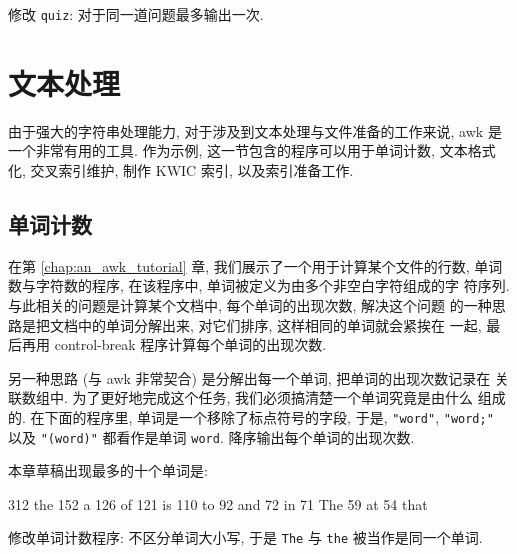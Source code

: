 \begin{exercise}
    \label{exer:quiz}
    修改 \texttt{quiz}: 对于同一道问题最多输出一次.
\end{exercise}

\section{文本处理}
\label{sec:text_processing}

由于强大的字符串处理能力, 对于涉及到文本处理与文件准备的工作来说, awk 是
一个非常有用的工具. 作为示例, 这一节包含的程序可以用于单词计数, 文本格式
化, 交叉索引维护, 制作 KWIC 索引, 以及索引准备工作.

\subsection{单词计数}
\label{subsec:word_counts}

在第 \ref{chap:an_awk_tutorial} 章, 我们展示了一个用于计算某个文件的行数,
单词数与字符数的程序, 在该程序中, 单词被定义为由多个非空白字符组成的字
符序列. 与此相关的问题是计算某个文档中, 每个单词的出现次数, 解决这个问题
的一种思路是把文档中的单词分解出来, 对它们排序, 这样相同的单词就会紧挨在
一起, 最后再用 control-break 程序计算每个单词的出现次数.

另一种思路 (与 awk 非常契合) 是分解出每一个单词, 把单词的出现次数记录在
关联数组中. 为了更好地完成这个任务, 我们必须搞清楚一个单词究竟是由什么
组成的. 在下面的程序里, 单词是一个移除了标点符号的字段, 于是,
\texttt{"word"}, \texttt{"word;"} 以及 \texttt{"(word)"} 都看作是单词
\texttt{word}. \END 降序输出每个单词的出现次数.
本章草稿出现最多的十个单词是:
\begin{awkcode}
    312 the     152 a       126 of      121 is      110 to
    92 and      72 in       71 The      59 at       54 that
\end{awkcode}

\begin{exercise}
    \label{exer:wordcount}
    修改单词计数程序: 不区分单词大小写, 于是 \texttt{The} 与
    \texttt{the} 被当作是同一个单词.
\end{exercise}

